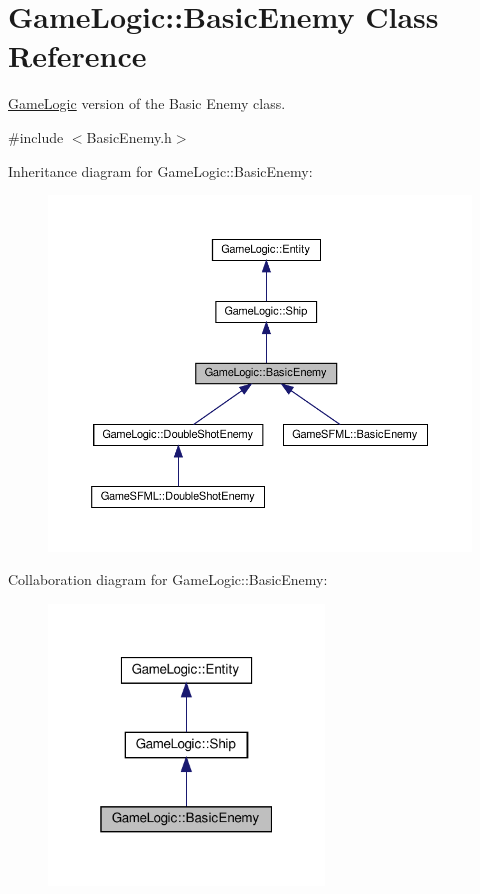\hypertarget{classGameLogic_1_1BasicEnemy}{}\section{Game\+Logic\+:\+:Basic\+Enemy Class Reference}
\label{classGameLogic_1_1BasicEnemy}


\hyperlink{namespaceGameLogic}{Game\+Logic} version of the Basic Enemy class.  




{\ttfamily \#include $<$Basic\+Enemy.\+h$>$}



Inheritance diagram for Game\+Logic\+:\+:Basic\+Enemy\+:
\nopagebreak
\begin{figure}[H]
\begin{center}
\leavevmode
\includegraphics[width=350pt]{classGameLogic_1_1BasicEnemy__inherit__graph}
\end{center}
\end{figure}


Collaboration diagram for Game\+Logic\+:\+:Basic\+Enemy\+:
\nopagebreak
\begin{figure}[H]
\begin{center}
\leavevmode
\includegraphics[width=208pt]{classGameLogic_1_1BasicEnemy__coll__graph}
\end{center}
\end{figure}
